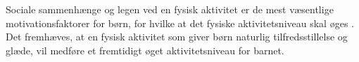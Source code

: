 Sociale sammenhænge og legen ved en fysisk aktivitet er de mest væsentlige motivationsfaktorer for børn, for hvilke at det fysiske aktivitetsniveau skal øges \citep{}. Det fremhæves, at en fysisk aktivitet som giver børn naturlig tilfredsstillelse og glæde, vil medføre et fremtidigt øget aktivitetsniveau for barnet.
